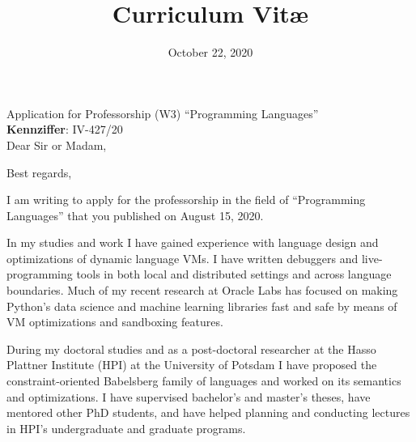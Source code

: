 \documentclass[11pt,a4paper,sans]{moderncv} %
\title{Curriculum Vit\ae{}}
\begin{document}


\clearpage

\date{October 22, 2020} %
\opening{Application for Professorship (W3) ``Programming
  Languages''\\
  \textbf{Kennziffer}: IV-427/20\\
  \vspace{4\parskip} Dear Sir or Madam,} %
\closing{Best regards,} %

\makelettertitle %

I am writing to apply for the professorship in the field of ``Programming
Languages'' that you published on August 15, 2020.

In my studies and work I have gained experience with language design and
optimizations of dynamic language VMs. I have written debuggers and
live-programming tools in both local and distributed settings and across
language boundaries. Much of my recent research at Oracle Labs has focused on
making Python's data science and machine learning libraries fast and safe by
means of VM optimizations and sandboxing features.

During my doctoral studies and as a post-doctoral researcher at the Hasso
Plattner Institute (HPI) at the University of Potsdam I have proposed the
constraint-oriented Babelsberg family of languages and worked on its semantics
and optimizations. I have supervised bachelor's and master's theses, have
mentored other PhD students, and have helped planning and conducting lectures in
HPI's undergraduate and graduate programs.
\end{document}
